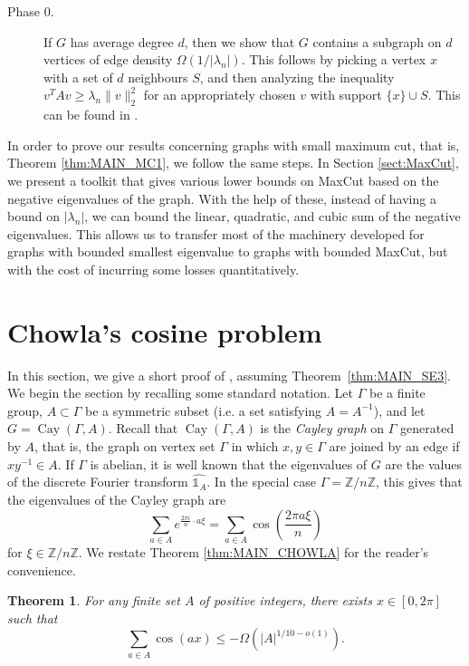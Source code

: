 \documentclass[11pt]{article}
\theoremstyle{plain}
\newtheorem{theorem}{Theorem}[section]
\theoremstyle{definition}
\DeclareMathOperator{\Cay}{Cay}
\begin{document}
\begin{description}
    \item[Phase 0.] If $G$ has average degree $d$, then we show that $G$ contains a subgraph on $d$ vertices of edge density $\Omega(1/|\lambda_n|)$. This follows by picking a vertex $x$ with a set of $d$ neighbours $S$, and then analyzing the inequality $v^TAv\geq \lambda_n \|v\|_2^2$ for an appropriately chosen $v$ with support $\{x\}\cup S$. This can be found in .
\end{description}

In order to prove our results concerning graphs with small maximum cut, that is, Theorem \ref{thm:MAIN_MC1}, we follow the same steps. In Section \ref{sect:MaxCut}, we present a toolkit that gives various lower bounds on MaxCut based on the negative eigenvalues of the graph. With the help of these, instead of having a bound on $|\lambda_n|$, we can bound the linear, quadratic, and cubic sum of the negative eigenvalues. This allows us to transfer most of the machinery developed for graphs with bounded smallest eigenvalue to graphs with bounded MaxCut, but with the cost of incurring some losses quantitatively.


\section{Chowla's cosine problem}\label{sect:chowla}

In this section, we give a short proof of , assuming Theorem~\ref{thm:MAIN_SE3}. We begin the section by recalling some standard notation. Let $\Gamma$ be a finite group, $A\subset \Gamma$ be a symmetric subset (i.e. a set satisfying $A=A^{-1}$), and let $G=\Cay(\Gamma, A)$. Recall that $\Cay(\Gamma,A)$ is the \emph{Cayley graph} on $\Gamma$ generated by $A$, that is, the graph on vertex set $\Gamma$ in which $x,y\in \Gamma$ are joined by an edge if $xy^{-1}\in A$. 
If $\Gamma$ is abelian, it is well known that the eigenvalues of $G$ are the values of the discrete Fourier transform $\widehat{\mathds{1}_{A}}$. 
In the special case $\Gamma=\mathbb{Z}/n\mathbb{Z}$, this gives that the eigenvalues of the Cayley graph are
$$\sum_{a\in A}e^{\frac{2 \pi i}{n}\cdot a\xi} = \sum_{a \in A} \cos\left(\frac{2\pi a\xi}{n} \right)$$
for $\xi \in \mathbb{Z}/n\mathbb{Z}$. We restate Theorem \ref{thm:MAIN_CHOWLA} for the reader's convenience.

\begin{theorem}
For any finite set $A$ of positive integers, there exists $x\in [0,2\pi]$ such that 
$$\sum_{a\in A}\cos(ax)\leq -\Omega(|A|^{1/10-o(1)}).$$
\end{theorem}
\end{document}
